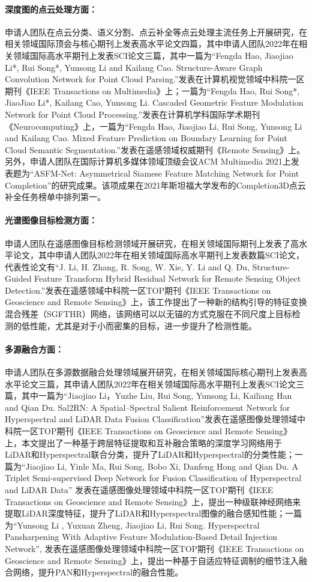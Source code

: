 \documentclass[12pt]{article}
\newcommand{\myPara}[1]{\paragraph{#1：}}
\begin{document}
\myPara{深度图的点云处理方面}
申请人团队在点云分类、语义分割、点云补全等点云处理主流任务上开展研究，在相关领域国际顶会与核心期刊上发表高水平论文四篇，其中申请人团队2022年在相关领域国际高水平期刊上发表SCI论文三篇，其中一篇为“Fengda Hao, Jiaojiao Li*, Rui Song*, Yunsong Li and Kailang Cao. Structure-Aware Graph Convolution Network for Point Cloud Parsing.”发表在计算机视觉领域中科院一区期刊《IEEE Transactions on Multimedia》上；一篇为“Fengda Hao, Rui Song*, JiaoJiao Li*, Kailang Cao, Yunsong Li. Cascaded Geometric Feature Modulation Network for Point Cloud Processing.”发表在计算机学科国际学术期刊《Neurocomputing》上，一篇为“Fengda Hao, Jiaojiao Li, Rui Song, Yunsong Li and Kailang Cao. Mixed Feature Prediction on Boundary Learning for Point Cloud Semantic Segmentation.”发表在遥感领域权威期刊《Remote Sensing》上。另外，申请人团队在国际计算机多媒体领域顶级会议ACM Multimedia 2021上发表题为“ASFM-Net: Asymmetrical Siamese Feature Matching Network for Point Completion”的研究成果。该项成果在2021年斯坦福大学发布的Completion3D点云补全任务榜单中排列第一。

\myPara{光谱图像目标检测方面}
申请人团队在遥感图像目标检测领域开展研究，在相关领域国际期刊上发表了高水平论文，其中申请人团队2022年在相关领域国际高水平期刊上发表数篇SCI论文，代表性论文有“J. Li, H. Zhang, R. Song, W. Xie, Y. Li and Q. Du, Structure-Guided Feature Transform Hybrid Residual Network for Remote Sensing Object Detection.”发表在遥感领域中科院一区TOP期刊《IEEE Transactions on Geoscience and Remote Sensing》上，该工作提出了一种新的结构引导的特征变换混合残差（SGFTHR）网络，该网络可以以无锚的方式克服在不同尺度上目标检测的低性能，尤其是对于小而密集的目标，进一步提升了检测性能。

\myPara{多源融合方面}
申请人团队在多源数据融合处理领域展开研究，在相关领域国际核心期刊上发表高水平论文三篇，其申请人团队2022年在相关领域国际高水平期刊上发表SCI论文三篇，其中一篇为“Jiaojiao Li，Yuzhe Liu, Rui Song, Yunsong Li, Kailiang Han and Qian Du. Sal2RN: A Spatial–Spectral Salient Reinforcement Network for Hyperspectral and LiDAR Data Fusion Classification”发表在遥感图像处理领域中科院一区TOP期刊《IEEE Transactions on Geoscience and Remote Sensing》上，本文提出了一种基于跨层特征提取和互补融合策略的深度学习网络用于LiDAR和Hyperspectral联合分类，提升了LiDAR和Hyperspectral的分类性能；一篇为“Jiaojiao Li, Yinle Ma, Rui Song, Bobo Xi, Danfeng Hong and Qian Du. A Triplet Semi-supervised Deep Network for Fusion Classification of Hyperspectral and LiDAR Data” 发表在遥感图像处理领域中科院一区TOP期刊《IEEE Transactions on Geoscience and Remote Sensing》上，提出一种级联神经网络来提取LiDAR深度特征，提升了LiDAR和Hyperspectral图像的融合感知性能；一篇为“Yunsong Li , Yuxuan Zheng, Jiaojiao Li, Rui Song. Hyperspectral Pansharpening With Adaptive Feature Modulation-Based Detail Injection Network”, 发表在遥感图像处理领域中科院一区TOP期刊《IEEE Transactions on Geoscience and Remote Sensing》上，提出一种基于自适应特征调制的细节注入融合网络，提升PAN和Hyperspectral的融合性能。
\end{document}
